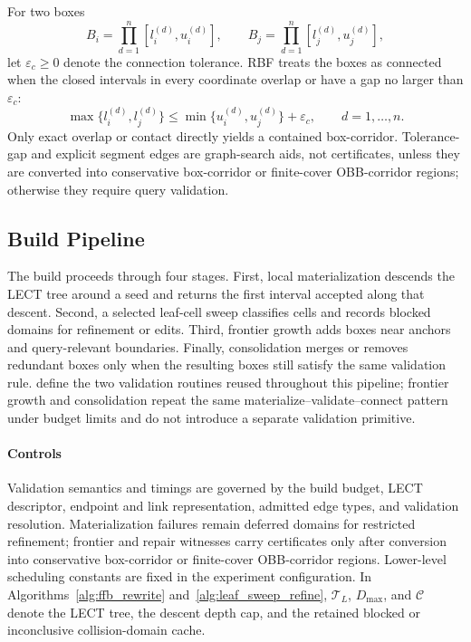 \documentclass[journal]{IEEEtran}
\DeclareRobustCommand{\textsc}[1]{\textnormal{\MakeUppercase{#1}}}
\newcommand{\rbf}{\textsc{RBF}}
\begin{document}
For two boxes
\[
B_i=\prod_{d=1}^{n}[l_i^{(d)},u_i^{(d)}],\qquad
B_j=\prod_{d=1}^{n}[l_j^{(d)},u_j^{(d)}],
\]
let \(\varepsilon_c\ge 0\) denote the connection tolerance. \rbf{} treats the
boxes as connected when the closed intervals in every coordinate overlap or have
a gap no larger than \(\varepsilon_c\):
\[
\max\{l_i^{(d)},l_j^{(d)}\}
\le
\min\{u_i^{(d)},u_j^{(d)}\}+\varepsilon_c,\qquad d=1,\ldots,n.
\]
Only exact overlap or contact directly yields a contained box-corridor.
Tolerance-gap and explicit segment edges are graph-search aids, not
certificates, unless they are converted into conservative box-corridor or
finite-cover OBB-corridor regions; otherwise they require query validation.

\subsection{Build Pipeline}

The build proceeds through four stages. First, local materialization descends
the LECT tree around a seed and returns the first interval accepted along that
descent.
Second, a selected leaf-cell sweep classifies cells and records blocked domains
for refinement or edits. Third, frontier growth adds boxes near anchors and
query-relevant boundaries. Finally, consolidation merges or removes redundant
boxes only when the resulting boxes still satisfy the same validation rule.
 define the two validation routines
reused throughout this pipeline; frontier growth and consolidation repeat the
same materialize--validate--connect pattern under budget limits and do not
introduce a separate validation primitive.

\paragraph{Controls}
Validation semantics and timings are governed by the build budget, LECT
descriptor, endpoint and link representation, admitted edge types, and
validation resolution.
Materialization failures remain deferred domains for restricted refinement;
frontier and repair witnesses carry certificates only after conversion into
conservative box-corridor or finite-cover OBB-corridor regions.
Lower-level scheduling constants are fixed in the experiment configuration.
In Algorithms~\ref{alg:ffb_rewrite} and~\ref{alg:leaf_sweep_refine},
\(\mathcal{T}_L\), \(D_{\max}\), and \(\mathcal{C}\) denote the LECT tree, the
descent depth cap, and the retained blocked or inconclusive collision-domain
cache.
\end{document}
